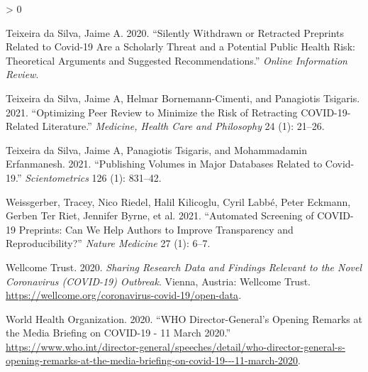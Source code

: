 \documentclass[
]{article}
\newlength{\cslhangindent}
\newenvironment{CSLReferences}[2] %
 {%
  \setlength{\parindent}{0pt}
  \ifodd #1 \everypar{\setlength{\hangindent}{\cslhangindent}}\ignorespaces\fi
  \ifnum #2 > 0
  \setlength{\parskip}{#2\baselineskip}
  \fi
 }%
 {}
\begin{document}
\begin{CSLReferences}{1}{0}
\leavevmode\hypertarget{ref-da2020silently}{}%
Teixeira da Silva, Jaime A. 2020. {``Silently Withdrawn or Retracted Preprints Related to Covid-19 Are a Scholarly Threat and a Potential Public Health Risk: Theoretical Arguments and Suggested Recommendations.''} \emph{Online Information Review}.

\leavevmode\hypertarget{ref-da2021optimizing}{}%
Teixeira da Silva, Jaime A, Helmar Bornemann-Cimenti, and Panagiotis Tsigaris. 2021. {``Optimizing Peer Review to Minimize the Risk of Retracting COVID-19-Related Literature.''} \emph{Medicine, Health Care and Philosophy} 24 (1): 21--26.

\leavevmode\hypertarget{ref-da2021publishing}{}%
Teixeira da Silva, Jaime A, Panagiotis Tsigaris, and Mohammadamin Erfanmanesh. 2021. {``Publishing Volumes in Major Databases Related to Covid-19.''} \emph{Scientometrics} 126 (1): 831--42.

\leavevmode\hypertarget{ref-weissgerber2021automated}{}%
Weissgerber, Tracey, Nico Riedel, Halil Kilicoglu, Cyril Labbé, Peter Eckmann, Gerben Ter Riet, Jennifer Byrne, et al. 2021. {``Automated Screening of COVID-19 Preprints: Can We Help Authors to Improve Transparency and Reproducibility?''} \emph{Nature Medicine} 27 (1): 6--7.

\leavevmode\hypertarget{ref-citeWellcome}{}%
Wellcome Trust. 2020. \emph{Sharing Research Data and Findings Relevant to the Novel Coronavirus (COVID-19) Outbreak}. Vienna, Austria: Wellcome Trust. \url{https://wellcome.org/coronavirus-covid-19/open-data}.

\leavevmode\hypertarget{ref-citeWHOtimeline}{}%
World Health Organization. 2020. {``WHO Director-General's Opening Remarks at the Media Briefing on COVID-19 - 11 March 2020.''} \url{https://www.who.int/director-general/speeches/detail/who-director-general-s-opening-remarks-at-the-media-briefing-on-covid-19---11-march-2020}.

\end{CSLReferences}
\end{document}
